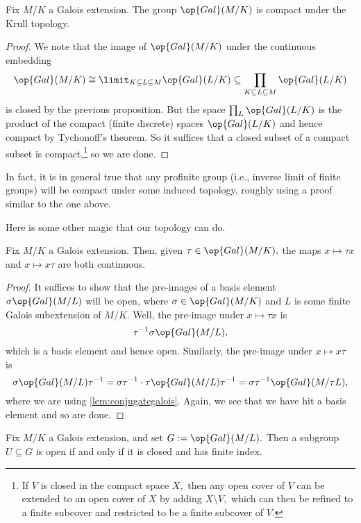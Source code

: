 \begin{theorem}
	Fix $M/K$ a Galois extension. The group $\op{Gal}(M/K)$ is compact under the Krull topology.
\end{theorem}
\begin{proof}
	We note that the image of $\op{Gal}(M/K)$ under the continuous embedding
	\[\op{Gal}(M/K)\cong\limit_{K\subseteq L\subseteq M}\op{Gal}(L/K)\subseteq\prod_{K\subseteq L\subseteq M}\op{Gal}(L/K)\]
	is closed by the previous proposition. But the space $\prod_L\op{Gal}(L/K)$ is the product of the compact (finite discrete) spaces $\op{Gal}(L/K)$ and hence compact by Tychonoff's theorem. So it suffices that a closed subset of a compact subset is compact,\footnote{If $V$ is closed in the compact space $X,$ then any open cover of $V$ can be extended to an open cover of $X$ by adding $X\setminus V,$ which can then be refined to a finite subcover and restricted to be a finite subcover of $V.$} so we are done.
\end{proof}
\begin{remark}
	In fact, it is in general true that any profinite group (i.e., inverse limit of finite groups) will be compact under some induced topology, roughly using a proof similar to the one above.
\end{remark}
Here is some other magic that our topology can do.
\begin{proposition}
	Fix $M/K$ a Galois extension. Then, given $\tau\in\op{Gal}(M/K),$ the maps $x\mapsto\tau x$ and $x\mapsto x\tau$ are both continuous.
\end{proposition}
\begin{proof}
	It suffices to show that the pre-images of a basis element $\sigma\op{Gal}(M/L)$ will be open, where $\sigma\in\op{Gal}(M/K)$ and $L$ is some finite Galois subextension of $M/K.$ Well, the pre-image under $x\mapsto\tau x$ is
	\[\tau^{-1}\sigma\op{Gal}(M/L),\]
	which is a basis element and hence open. Similarly, the pre-image under $x\mapsto x\tau$ is
	\[\sigma\op{Gal}(M/L)\tau^{-1}=\sigma\tau^{-1}\cdot\tau\op{Gal}(M/L)\tau^{-1}=\sigma\tau^{-1}\op{Gal}(M/\tau L),\]
	where we are using \autoref{lem:conjugategalois}. Again, we see that we have hit a basis element and so are done.
\end{proof}
\begin{proposition}
	Fix $M/K$ a Galois extension, and set $G:=\op{Gal}(M/L).$ Then a subgroup $U\subseteq G$ is open if and only if it is closed and has finite index.
\end{proposition}
